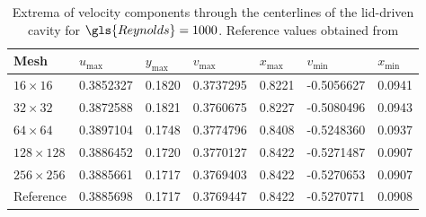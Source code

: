 \begin{table}[]
	\centering
	\begin{tabular}{lllllrr}
		\hline
		Mesh           & $u_{\text{max}}$ & $y_{\text{max}}$ & $v_{\text{max}}$ & $x_{\text{max}}$ & \multicolumn{1}{l}{$v_{\text{min}}$} & \multicolumn{1}{l}{$x_{\text{min}}$} \\ \hline
		$16\times16$   & 0.3852327        & 0.1820           & 0.3737295        & 0.8221           & -0.5056627                           & 0.0941                               \\
		$32\times32$   & 0.3872588        & 0.1821           & 0.3760675        & 0.8227           & -0.5080496                           & 0.0943                               \\
		$64\times64$   & 0.3897104        & 0.1748           & 0.3774796        & 0.8408           & -0.5248360                           & 0.0937                               \\
		$128\times128$ & 0.3886452        & 0.1720           & 0.3770127        & 0.8422           & -0.5271487                           & 0.0907                               \\
		$256\times256$ & 0.3885661        & 0.1717           & 0.3769403        & 0.8422           & -0.5270653                           & 0.0907                               \\\hline
		Reference      & 0.3885698        & 0.1717           & 0.3769447        & 0.8422           & \multicolumn{1}{l}{-0.5270771}       & \multicolumn{1}{l}{0.0908}           \\ \hline
	\end{tabular}
	\caption{Extrema of velocity components through the centerlines of the lid-driven cavity for $\gls{Reynolds} = 1000$. Reference values obtained from \textcite{botellaBenchmarkSpectralResults1998} }
	\label{tab:LidCavityExtrema}
\end{table}
\FloatBarrier
